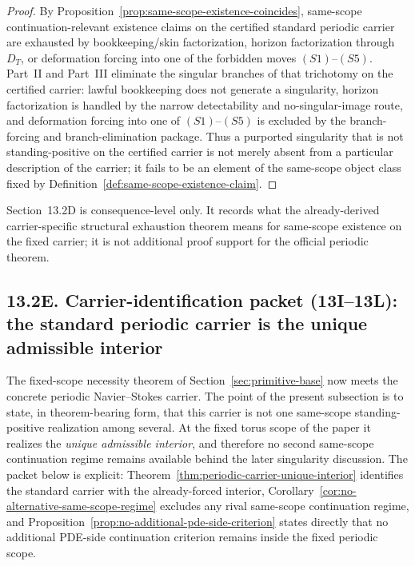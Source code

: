 \begin{proof}
By Proposition~\ref{prop:same-scope-existence-coincides}, same-scope continuation-relevant existence
claims on the certified standard periodic carrier are exhausted by bookkeeping/skin factorization,
horizon factorization through $D_T$, or deformation forcing into one of the forbidden moves
$(S1)$--$(S5)$. Part~II and Part~III eliminate the singular branches of that trichotomy on the
certified carrier: lawful bookkeeping does not generate a singularity, horizon factorization is
handled by the narrow detectability and no-singular-image route, and deformation forcing into one of
$(S1)$--$(S5)$ is excluded by the branch-forcing and branch-elimination package. Thus a purported
singularity that is not standing-positive on the certified carrier is not merely absent from a
particular description of the carrier; it fails to be an element of the same-scope object class
fixed by Definition~\ref{def:same-scope-existence-claim}.
\end{proof}

\begin{remark}
Section~13.2D is consequence-level only. It records what the already-derived carrier-specific
structural exhaustion theorem means for same-scope existence on the fixed carrier; it is not
additional proof support for the official periodic theorem.
\end{remark}


\subsection*{13.2E. Carrier-identification packet (13I--13L): the standard periodic carrier is the unique admissible interior}
The fixed-scope necessity theorem of Section~\ref{sec:primitive-base} now meets the concrete periodic
Navier--Stokes carrier. The point of the present subsection is to state, in theorem-bearing form, that
this carrier is not one same-scope standing-positive realization among several. At the fixed torus
scope of the paper it realizes the \emph{unique admissible interior}, and therefore no second same-scope
continuation regime remains available behind the later singularity discussion. The packet below is
explicit: Theorem~\ref{thm:periodic-carrier-unique-interior} identifies the standard carrier with the
already-forced interior, Corollary~\ref{cor:no-alternative-same-scope-regime} excludes any rival
same-scope continuation regime, and Proposition~\ref{prop:no-additional-pde-side-criterion} states
directly that no additional PDE-side continuation criterion remains inside the fixed periodic scope.

